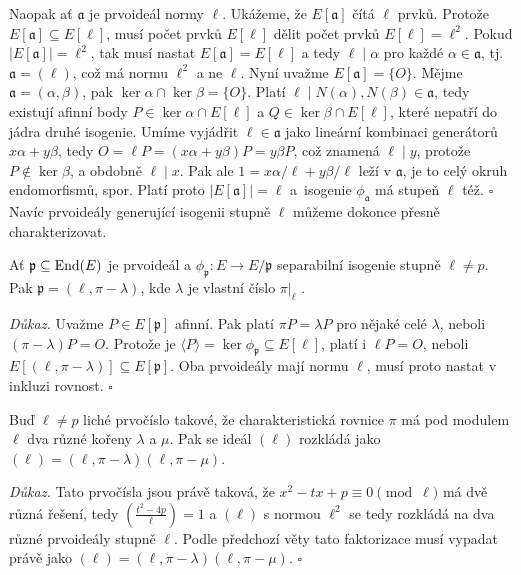 \documentclass[12pt]{report}
\begin{document}
Naopak ať $\mathfrak{a}$ je prvoideál normy $\ell$. Ukážeme, že $E[\mathfrak{a}]$ čítá $\ell$ prvků. Protože $E[\mathfrak{a}] \subseteq E[\ell]$, musí počet prvků $E[\ell]$ dělit počet prvků $E[\ell] = \ell^2$. Pokud $\vert E[\mathfrak{a}] \vert = \ell^2$, tak musí nastat $E[\mathfrak{a}] = E[\ell]$ a tedy $\ell \mid \alpha$ pro každé $\alpha \in \mathfrak{a}$, tj. $\mathfrak{a} = (\ell)$, což má normu $\ell^2$ a ne $\ell$. Nyní uvažme $E[\mathfrak{a}] = \lbrace O \rbrace$. Mějme $\mathfrak{a} = (\alpha,\beta)$, pak $\ker \alpha \cap \ker \beta = \lbrace O \rbrace$. Platí $\ell \mid N(\alpha),N(\beta) \in \mathfrak{a}$, tedy existují afinní body $P \in \ker \alpha \cap E[\ell]$ a $Q \in \ker \beta \cap E[\ell]$, které nepatří do jádra druhé isogenie. Umíme vyjádřit $\ell \in \mathfrak{a}$ jako lineární kombinaci generátorů $x \alpha + y \beta$, tedy $O = \ell P = (x \alpha + y \beta) P  = y \beta P$, což znamená $\ell \mid y$, protože $P \not\in \ker \beta$, a obdobně $\ell \mid x$. Pak ale $1 = x\alpha /\ell + y \beta/\ell $ leží v $\mathfrak{a}$, je to celý okruh endomorfismů, spor. Platí proto $\vert E[\mathfrak{a}] \vert = \ell$ a~isogenie $\phi_\mathfrak{a}$ má stupeň $\ell$ též. \hfill $\square$\\

Navíc prvoideály generující isogenii stupně $\ell$ můžeme dokonce přesně charakterizovat.

\begin{veta}
Ať $\mathfrak{p} \subseteq \operatorname{End}(E)$ je prvoideál a $\phi_{\mathfrak{p}} : E \longrightarrow E/\mathfrak{p}$ separabilní isogenie stupně $\ell \neq p$. Pak $\mathfrak{p} = (\ell, \pi - \lambda)$, kde $\lambda$ je vlastní číslo $\pi \vert_{\ell}$ .
\end{veta}
\noindent \textit{Důkaz.} Uvažme $P \in E[\mathfrak{p}]$ afinní. Pak platí $\pi P = \lambda P$ pro nějaké celé $\lambda$, neboli $(\pi - \lambda) P = O$. Protože je $\langle P \rangle = \ker \phi_{\mathfrak{p}} \subseteq E[\ell]$, platí i $\ell P = O$, neboli $E[(\ell,\pi-\lambda)] \subseteq E[\mathfrak{p}]$. Oba prvoideály mají normu $\ell$, musí proto nastat v inkluzi rovnost.  \hfill $\square$\\ 

\begin{dusledek}\label{duslodok}
Buď $\ell \neq p$ liché prvočíslo takové, že charakteristická rovnice $\pi$ má pod modulem $\ell$ dva různé kořeny $\lambda$ a $\mu$. Pak se ideál $(\ell)$ rozkládá jako $(\ell) = (\ell,\pi - \lambda)(\ell, \pi - \mu)$.
\end{dusledek}
\noindent \textit{Důkaz.} Tato prvočísla jsou právě taková, že $x^2 - tx + p \equiv 0 \pmod{\ell}$ má dvě různá řešení, tedy $\genfrac{(}{)}{}{}{t^2-4p}{\ell} = 1$ a $(\ell)$ s normou $\ell^2$ se tedy rozkládá na dva různé prvoideály stupně $\ell$. Podle předchozí věty tato faktorizace musí vypadat právě jako $(\ell) = (\ell,\pi-\lambda)(\ell,\pi-\mu)$. \hfill $\square$\\
\end{document}
